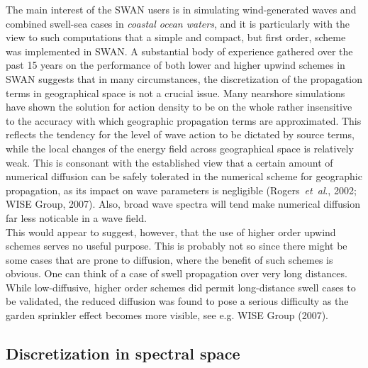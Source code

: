 \documentclass[12pt]{book}
\begin{document}
The main interest of the SWAN users is in simulating wind-generated waves and combined swell-sea cases in {\em coastal ocean waters},
and it is particularly with the view to
such computations that a simple and compact, but first order, scheme was implemented in SWAN.
A substantial body of experience gathered over the past 15 years on the performance of both lower and higher upwind schemes in SWAN suggests that in many circumstances,
the discretization of the propagation terms in geographical space is not a crucial issue. Many nearshore simulations have shown the solution for action density to
be on the whole rather insensitive to the accuracy with which geographic propagation terms are approximated.
This reflects the tendency for the level of wave action to be dictated by source terms, while the local changes of
the energy field across geographical space is relatively weak.
This is consonant with the established view that a certain amount of numerical diffusion can be safely tolerated in the numerical scheme for geographic propagation,
as its impact on wave parameters is negligible
(Rogers~{\it et~al}., 2002; WISE Group, 2007).
Also, broad wave spectra will tend make numerical diffusion far less noticable in a wave field.
\\[2ex]
\noindent
This would appear to suggest, however, that the use of higher order upwind schemes serves no useful purpose. This is probably not so since there might be some cases
that are prone to diffusion, where the benefit of such schemes is obvious. One can think of a case of swell propagation over very long distances. While low-diffusive,
higher order schemes did permit long-distance swell cases to be validated, the reduced diffusion was found to pose a serious difficulty as the garden sprinkler
effect becomes more visible, see e.g. WISE Group (2007).

\subsection{Discretization in spectral space}
\end{document}
